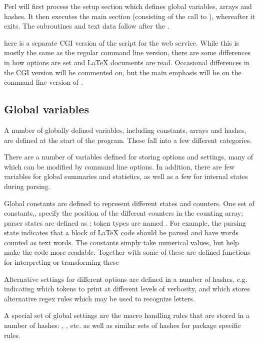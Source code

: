 \documentclass{article}
\newcommand\wild{\ldots}
\def\CGI#1\CGIend{#1} %
\def\CGIend{}
\begin{document}
Perl will first process the setup section which defines global variables, arrays and hashes. It then executes the main section (consisting of the call to ), whereafter it exits. The subroutines and text data follow after the .

\CGI
There is a separate CGI version of the \TeXcount{} script for the web service. While this is mostly the same as the regular command line version, there are some differences in how options are set and \LaTeX{} documents are read. Occasional differences in the CGI version will be commented on, but the main emphasis will be on the command line version of \TeXcount{}.
\CGIend


\subsection{Global variables}

A number of globally defined variables, including constants, arrays and hashes, are defined at the start of the program. These fall into a few different categories.

There are a number of variables defined for storing options and settings, many of which can be modified by command line options. In addition, there are few variables for global summaries and statistics, as well as a few for internal states during parsing.

Global constants are defined to represent different states and counters. One set of constants,\code{\$CNT_\wild}, specify the position of the different counters in the counting array; parser states are defined as \code{\$STATE_\wild}; token types are named \code{\$TOKEN_\wild}. For example, the parsing state  indicates that a block of \LaTeX{} code should be parsed and have words counted as text words. The constants simply take numerical values, but help make the code more readable. Together with some of these are defined functions for interpreting or transforming these 

Alternative settings for different options are defined in a number of hashes, e.g.  indicating which tokens to print at different levels of verbosity, and  which stores alternative regex rules which may be used to recognize letters.

A special set of global settings are the macro handling rules that are stored in a number of hashes: , , etc. as well as similar sets of hashes for package specific rules.
\end{document}
